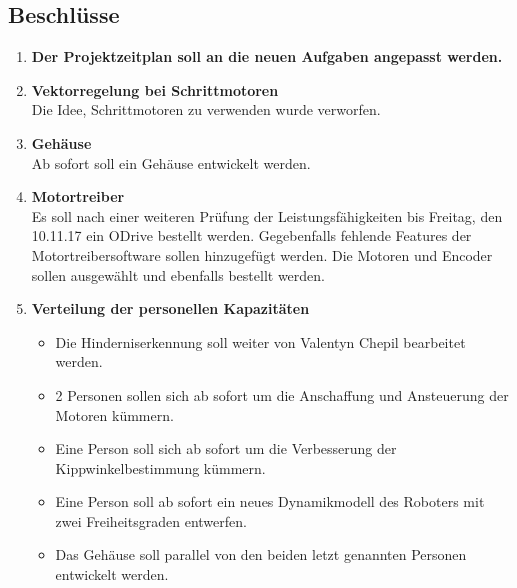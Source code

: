 \documentclass[10pt]{scrartcl}
\begin{document}
\subsection*{Beschlüsse}
	\begin{enumerate}
        \item \textbf{Der Projektzeitplan soll an die neuen Aufgaben angepasst werden.}
        \item \textbf{Vektorregelung bei Schrittmotoren} \\
        Die Idee, Schrittmotoren zu verwenden wurde verworfen.
        \item \textbf{Gehäuse} \\
        Ab sofort soll ein Gehäuse entwickelt werden.
        \item \textbf{Motortreiber} \\
        Es soll nach einer weiteren Prüfung der Leistungsfähigkeiten bis Freitag, den 10.11.17 ein ODrive bestellt werden. Gegebenfalls fehlende Features der Motortreibersoftware sollen hinzugefügt werden. Die Motoren und Encoder sollen ausgewählt und ebenfalls bestellt werden.
        \item \textbf{Verteilung der personellen Kapazitäten}
        \begin{itemize}%
            \item Die Hinderniserkennung soll weiter von Valentyn Chepil bearbeitet werden.
            \item 2 Personen sollen sich ab sofort um die Anschaffung und Ansteuerung der Motoren kümmern.
            \item Eine Person soll sich ab sofort um die Verbesserung der Kippwinkelbestimmung kümmern.
            \item Eine Person soll ab sofort ein neues Dynamikmodell des Roboters mit zwei Freiheitsgraden entwerfen.
            \item Das Gehäuse soll parallel von den beiden letzt genannten Personen entwickelt werden.
        \end{itemize}
	\end{enumerate}
\end{document}
